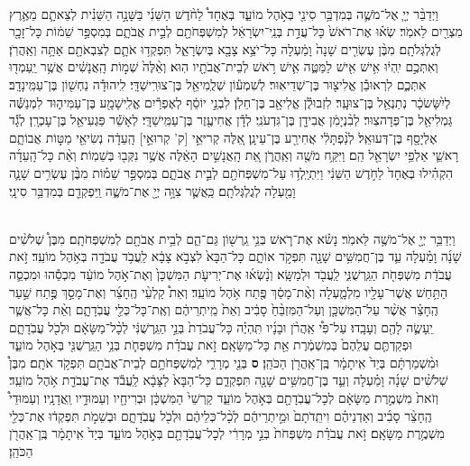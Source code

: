 \documentclass[twoside, openany, parskip=half, 11pt]{book}
\begin{document}
\begin{footnotesize}
\begin{multicols}{2}
\\
 וַיְדַבֵּ֨ר יְיָ֧ אֶל־מֹשֶׁ֛ה בְּמִדְבַּ֥ר סִינַ֖י בְּאֹ֣הֶל מוֹעֵ֑ד בְּאֶחָד֩ לַחֹ֨דֶשׁ הַשֵּׁנִ֜י בַּשָּׁנָ֣ה הַשֵּׁנִ֗ית לְצֵאתָ֛ם מֵאֶ֥רֶץ מִצְרַ֖יִם לֵאמֹֽר׃ שְׂא֗וּ אֶת־רֹאשׁ֙ כָּל־עֲדַ֣ת בְּנֵֽי־יִשְׂרָאֵ֔ל לְמִשְׁפְּחֹתָ֖ם לְבֵ֣ית אֲבֹתָ֑ם בְּמִסְפַּ֣ר שֵׁמ֔וֹת כָּל־זָכָ֖ר לְגֻלְגְּלֹתָֽם׃ מִבֶּ֨ן עֶשְׂרִ֤ים שָׁנָה֙ וָמַ֔עְלָה כָּל־יֹצֵ֥א צָבָ֖א בְּיִשְׂרָאֵ֑ל תִּפְקְד֥וּ אֹתָ֛ם לְצִבְאֹתָ֖ם אַתָּ֥ה וְאַֽהֲרֹֽן׃ וְאִתְּכֶ֣ם יִֽהְי֔וּ אִ֥ישׁ אִ֖ישׁ לַמַּטֶּ֑ה אִ֛ישׁ רֹ֥אשׁ לְבֵית־אֲבֹתָ֖יו הֽוּא׃  וְאֵ֨לֶּה֙ שְׁמ֣וֹת הָֽאֲנָשִׁ֔ים אֲשֶׁ֥ר יַֽעַמְד֖וּ אִתְּכֶ֑ם לִרְאוּבֵ֕ן אֱלִיצ֖וּר בֶּן־שְׁדֵיאֽוּר׃ לְשִׁמְע֕וֹן שְׁלֻֽמִיאֵ֖ל בֶּן־צוּרִֽישַׁדָּֽי׃ לִֽיהוּדָ֕ה נַחְשׁ֖וֹן בֶּן־עַמִּֽינָדָֽב׃ לְיִ֨שָּׂשׂכָ֔ר נְתַנְאֵ֖ל בֶּן־צוּעָֽר׃ לִזְבוּלֻ֕ן אֱלִיאָ֖ב בֶּן־חֵלֹֽן׃ לִבְנֵ֣י יוֹסֵ֔ף לְאֶפְרַ֕יִם אֱלִֽישָׁמָ֖ע בֶּן־עַמִּיה֑וּד לִמְנַשֶּׁ֕ה גַּמְלִיאֵ֖ל בֶּן־פְּדָהצֽוּר׃ לְבִ֨נְיָמִ֔ן אֲבִידָ֖ן בֶּן־גִּדְעֹנִֽי׃ לְדָ֕ן אֲחִיעֶ֖זֶר בֶּן־עַמִּֽישַׁדָּֽי׃ לְאָשֵׁ֕ר פַּגְעִיאֵ֖ל בֶּן־עָכְרָֽן׃ לְגָ֕ד אֶלְיָסָ֖ף בֶּן־דְּעוּאֵֽל׃ לְנַ֨פְתָּלִ֔י אֲחִירַ֖ע בֶּן־עֵינָֽן׃ אֵ֚לֶּה קְריּאֵ֣י [ק' קְרוּאֵ֣י] הָֽעֵדָ֔ה נְשִׂיאֵ֖י מַטּ֣וֹת אֲבוֹתָ֑ם רָאשֵׁ֛י אַלְפֵ֥י יִשְׂרָאֵ֖ל הֵֽם׃  וַיִּקַּ֥ח מֹשֶׁ֖ה וְאַֽהֲרֹ֑ן אֵ֚ת הָֽאֲנָשִׁ֣ים הָאֵ֔לֶּה אֲשֶׁ֥ר נִקְּב֖וּ בְּשֵׁמֽוֹת׃ וְאֵ֨ת כָּל־הָֽעֵדָ֜ה הִקְהִ֗ילוּ בְּאֶחָד֙ לַחֹ֣דֶשׁ הַשֵּׁנִ֔י וַיִּתְיַֽלְד֥וּ עַל־מִשְׁפְּחֹתָ֖ם לְבֵ֣ית אֲבֹתָ֑ם בְּמִסְפַּ֣ר שֵׁמ֗וֹת מִבֶּ֨ן עֶשְׂרִ֥ים שָׁנָ֛ה וָמַ֖עְלָה לְגֻלְגְּלֹתָֽם׃ כַּֽאֲשֶׁ֛ר צִוָּ֥ה יְיָ֖ אֶת־מֹשֶׁ֑ה וַֽיִּפְקְדֵ֖ם בְּמִדְבַּ֥ר סִינָֽי׃

\\
 וַיְדַבֵּ֥ר יְיָ֖ אֶל־מֹשֶׁ֥ה לֵּאמֹֽר׃ נָשׂ֗א אֶת־רֹ֛אשׁ בְּנֵ֥י גֵֽרְשׁ֖וֹן גַּם־הֵ֑ם לְבֵ֥ית אֲבֹתָ֖ם לְמִשְׁפְּחֹתָֽם׃ מִבֶּן֩ שְׁלֹשִׁ֨ים שָׁנָ֜ה וָמַ֗עְלָה עַ֛ד בֶּן־חֲמִשִּׁ֥ים שָׁנָ֖ה תִּפְקֹ֣ד אוֹתָ֑ם כָּל־הַבָּא֙ לִצְבֹ֣א צָבָ֔א לַֽעֲבֹ֥ד עֲבֹדָ֖ה בְּאֹ֥הֶל מוֹעֵֽד׃ זֹ֣את עֲבֹדַ֔ת מִשְׁפְּחֹ֖ת הַגֵּֽרְשֻׁנִּ֑י לַֽעֲבֹ֖ד וּלְמַשָּֽׂא׃  וְנָ֨שְׂא֜וּ אֶת־יְרִיעֹ֤ת הַמִּשְׁכָּן֙ וְאֶת־אֹ֣הֶל מוֹעֵ֔ד מִכְסֵ֕הוּ וּמִכְסֵ֛ה הַתַּ֥חַשׁ אֲשֶׁר־עָלָ֖יו מִלְמָ֑עְלָה וְאֶ֨ת־מָסַ֔ךְ פֶּ֖תַח אֹ֥הֶל מוֹעֵֽד׃ וְאֵת֩ קַלְעֵ֨י הֶֽחָצֵ֜ר וְאֶת־מָסַ֣ךְ פֶּ֣תַח שַׁ֣עַר הֶֽחָצֵ֗ר אֲשֶׁ֨ר עַל־הַמִּשְׁכָּ֤ן וְעַל־הַמִּזְבֵּ֨חַ֙ סָבִ֔יב וְאֵת֙ מֵֽיתְרֵיהֶ֔ם וְאֶֽת־כָּל־כְּלֵ֖י עֲבֹֽדָתָ֑ם וְאֵ֨ת כָּל־אֲשֶׁ֧ר יֵֽעָשֶׂ֛ה לָהֶ֖ם וְעָבָֽדוּ׃ עַל־פִּ֩י אַֽהֲרֹ֨ן וּבָנָ֜יו תִּֽהְיֶ֗ה כָּל־עֲבֹדַת֙ בְּנֵ֣י הַגֵּֽרְשֻׁנִּ֔י לְכָ֨ל־מַשָּׂאָ֔ם וּלְכֹ֖ל עֲבֹֽדָתָ֑ם וּפְקַדְתֶּ֤ם עֲלֵהֶם֙ בְּמִשְׁמֶ֔רֶת אֵ֖ת כָּל־מַשָּׂאָֽם׃ זֹ֣את עֲבֹדַ֗ת מִשְׁפְּחֹ֛ת בְּנֵ֥י הַגֵּֽרְשֻׁנִּ֖י בְּאֹ֣הֶל מוֹעֵ֑ד וּמִ֨שְׁמַרְתָּ֔ם בְּיַד֙ אִֽיתָמָ֔ר בֶּֽן־אַֽהֲרֹ֖ן הַכֹּהֵֽן׃ \textbf{ס}  בְּנֵ֖י מְרָרִ֑י לְמִשְׁפְּחֹתָ֥ם לְבֵית־אֲבֹתָ֖ם תִּפְקֹ֥ד אֹתָֽם׃ מִבֶּן֩ שְׁלֹשִׁ֨ים שָׁנָ֜ה וָמַ֗עְלָה וְעַ֛ד בֶּן־חֲמִשִּׁ֥ים שָׁנָ֖ה תִּפְקְדֵ֑ם כָּל־הַבָּא֙ לַצָּבָ֔א לַֽעֲבֹ֕ד אֶת־עֲבֹדַ֖ת אֹ֥הֶל מוֹעֵֽד׃ וְזֹאת֙ מִשְׁמֶ֣רֶת מַשָּׂאָ֔ם לְכָל־עֲבֹֽדָתָ֖ם בְּאֹ֣הֶל מוֹעֵ֑ד קַרְשֵׁי֙ הַמִּשְׁכָּ֔ן וּבְרִיחָ֖יו וְעַמּוּדָ֥יו וַֽאֲדָנָֽיו׃ וְעַמּוּדֵי֩ הֶֽחָצֵ֨ר סָבִ֜יב וְאַדְנֵיהֶ֗ם וִיתֵֽדֹתָם֙ וּמֵ֣יתְרֵיהֶ֔ם לְכָ֨ל־כְּלֵיהֶ֔ם וּלְכֹ֖ל עֲבֹֽדָתָ֑ם וּבְשֵׁמֹ֣ת תִּפְקְד֔וּ אֶת־כְּלֵ֖י מִשְׁמֶ֥רֶת מַשָּׂאָֽם׃ זֹ֣את עֲבֹדַ֗ת מִשְׁפְּחֹת֙ בְּנֵ֣י מְרָרִ֔י לְכָל־עֲבֹֽדָתָ֖ם בְּאֹ֣הֶל מוֹעֵ֑ד בְּיַד֙ אִֽיתָמָ֔ר בֶּֽן־אַֽהֲרֹ֖ן הַכֹּהֵֽן׃ 		
 	

\end{multicols}
\end{footnotesize}
\end{document}
